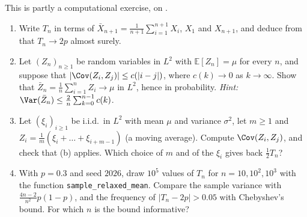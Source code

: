 \begin{exercise}\label{ex:cl-relaxed}
\medium This is partly a computational exercise, on .
\begin{enumerate}[label=(\alph*)]
  \item Write $T_n$ in terms of $\bar X_{n+1}=\frac1{n+1}\sum_{i=1}^{n+1}X_i$, $X_1$ and $X_{n+1}$,
    and deduce from  that $T_n\to2p$ almost surely.
  \item Let $(Z_n)_{n\ge1}$ be random variables in $L^2$ with $\mathbb E[Z_n]=\mu$ for every $n$,
    and suppose that $|\Cov(Z_i,Z_j)|\le c(|i-j|)$, where $c(k)\to0$ as $k\to\infty$. Show that
    $\bar Z_n=\frac1n\sum_{i=1}^nZ_i\to\mu$ in $L^2$, hence in probability. \emph{Hint:}
    $\Var(\bar Z_n)\le\frac2n\sum_{k=0}^{n-1}c(k)$.
  \item Let $(\xi_i)_{i\ge1}$ be i.i.d.\ in $L^2$ with mean $\mu$ and variance $\sigma^2$, let $m\ge1$
    and $Z_i=\frac1m(\xi_i+\dots+\xi_{i+m-1})$ (a moving average). Compute $\Cov(Z_i,Z_j)$, and
    check that (b) applies. Which choice of $m$ and of the $\xi_i$ gives back $\frac12T_n$?
  \item With $p=0.3$ and seed $2026$, draw $10^5$ values of $T_n$ for $n=10,10^2,10^3$ with the
    function \texttt{sample\_relaxed\_mean}. Compare the sample variance with $\frac{4n-2}{n^2}p(1-p)$,
    and the frequency of $|T_n-2p|>0.05$ with Chebyshev's bound. For which $n$ is the bound
    informative?
\end{enumerate}
\end{exercise}
